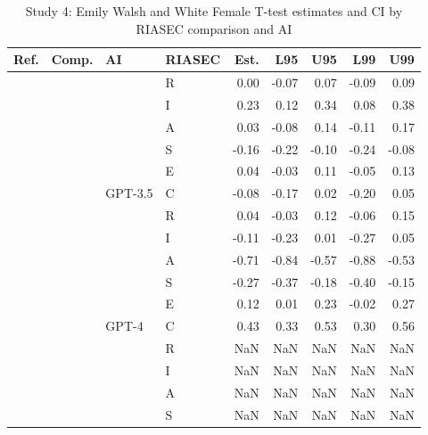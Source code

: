 \begin{table}

\caption{Study 4: Emily Walsh and White Female T-test estimates and CI by RIASEC comparison and AI}
\centering
\fontsize{8}{10}\selectfont
\begin{tabular}[t]{llllrrrrr}
\toprule
Ref. & Comp. & AI & RIASEC & Est. & L95 & U95 & L99 & U99\\
\midrule
 &  &  & R & 0.00 & -0.07 & 0.07 & -0.09 & 0.09\\

 &  &  & I & 0.23 & 0.12 & 0.34 & 0.08 & 0.38\\

 &  &  & A & 0.03 & -0.08 & 0.14 & -0.11 & 0.17\\

 &  &  & S & -0.16 & -0.22 & -0.10 & -0.24 & -0.08\\

 &  &  & E & 0.04 & -0.03 & 0.11 & -0.05 & 0.13\\

 &  & \multirow[t]{-6}{*}{\raggedright\arraybackslash GPT-3.5} & C & -0.08 & -0.17 & 0.02 & -0.20 & 0.05\\

 &  &  & R & 0.04 & -0.03 & 0.12 & -0.06 & 0.15\\

 &  &  & I & -0.11 & -0.23 & 0.01 & -0.27 & 0.05\\

 &  &  & A & -0.71 & -0.84 & -0.57 & -0.88 & -0.53\\

 &  &  & S & -0.27 & -0.37 & -0.18 & -0.40 & -0.15\\

 &  &  & E & 0.12 & 0.01 & 0.23 & -0.02 & 0.27\\

 &  & \multirow[t]{-6}{*}{\raggedright\arraybackslash GPT-4} & C & 0.43 & 0.33 & 0.53 & 0.30 & 0.56\\

 &  &  & R & NaN & NaN & NaN & NaN & NaN\\

 &  &  & I & NaN & NaN & NaN & NaN & NaN\\

 &  &  & A & NaN & NaN & NaN & NaN & NaN\\

 &  &  & S & NaN & NaN & NaN & NaN & NaN\\


\end{tabular}
\end{table}
